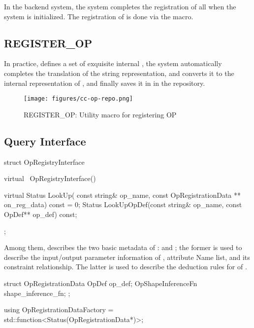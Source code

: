 \begin{content}
In the \cpp{} backend system, the system completes the registration of all  when the system is initialized. The registration of  is done via the  macro.


\subsection{REGISTER\_OP}
In practice,  defines a set of exquisite internal , the system automatically completes the translation of the string representation, and converts it to the internal representation of , and finally saves it in  in the repository.

\begin{figure}[!h]
  \centering
  \texttt{[image: figures/cc-op-repo.png]}
  \caption{REGISTER\_OP: Utility macro for registering OP}
  \label{fig:cc-op-repo}
\end{figure}


\subsection{Query Interface}

\begin{leftbar}
\begin{c++}
struct OpRegistryInterface {
  virtual ~OpRegistryInterface() {}

  virtual Status LookUp(
    const string& op_name,
    const OpRegistrationData ** on_reg_data) const = 0;
  Status LookUpOpDef(const string& op_name, const OpDef** op_def) const;
};
\end{c++}
\end{leftbar}

Among them,  describes the two basic metadata of :  and ; the former is used to describe the input/output parameter information of , attribute Name list, and its constraint relationship. The latter is used to describe the deduction rules for  of .

\begin{leftbar}
\begin{c++}
struct OpRegistrationData {
  OpDef op_def;
  OpShapeInferenceFn shape_inference_fn;
};

using OpRegistrationDataFactory = 
  std::function<Status(OpRegistrationData*)>;
\end{c++}
\end{leftbar}



\end{content}
